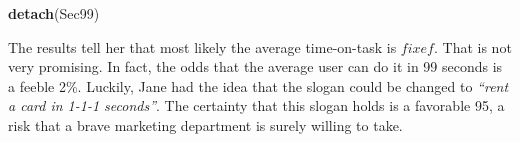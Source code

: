 \documentclass[]{svmono}
\newenvironment{Shaded}{\begin{snugshade}}{\end{snugshade}}
\newcommand{\KeywordTok}[1]{\textcolor[rgb]{0.13,0.29,0.53}{\textbf{#1}}}
\newcommand{\DataTypeTok}[1]{\textcolor[rgb]{0.13,0.29,0.53}{#1}}
\newcommand{\DecValTok}[1]{\textcolor[rgb]{0.00,0.00,0.81}{#1}}
\newcommand{\StringTok}[1]{\textcolor[rgb]{0.31,0.60,0.02}{#1}}
\newcommand{\OperatorTok}[1]{\textcolor[rgb]{0.81,0.36,0.00}{\textbf{#1}}}
\newcommand{\NormalTok}[1]{#1}
\theoremstyle{definition}
\theoremstyle{definition}
\theoremstyle{definition}
\theoremstyle{remark}
\begin{document}
\begin{Shaded}
\end{Shaded}

\begin{Shaded}
\begin{Highlighting}[]
\KeywordTok{detach}\NormalTok{(Sec99)}
\end{Highlighting}
\end{Shaded}

The results tell her that most likely the average time-on-task is
\(fixef\). That is not very promising. In fact, the odds that the
average user can do it in 99 seconds is a feeble 2\%. Luckily, Jane had
the idea that the slogan could be changed to \emph{``rent a card in
1-1-1 seconds''}. The certainty that this slogan holds is a favorable
95, a risk that a brave marketing department is surely willing to take.
\end{document}
